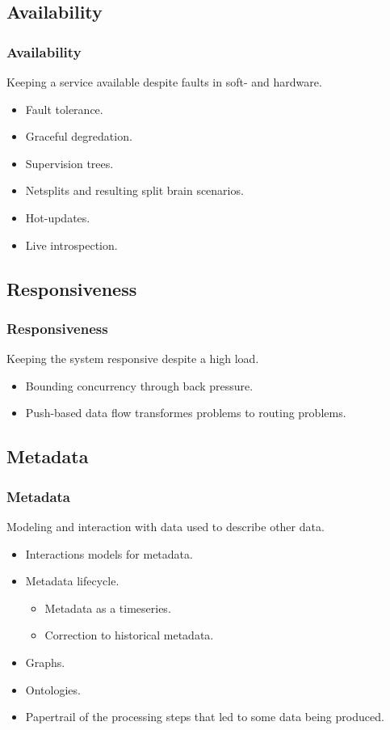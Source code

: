 \subsection{Availability}
\begin{frame}
    \frametitle{Availability}
    \vspace{0mm}
    Keeping a service available despite faults in soft- and hardware. 
    \vspace{3mm}
    \begin{itemize}
        \item Fault tolerance.
        \item Graceful degredation.
        \item Supervision trees.
        \item Netsplits and resulting split brain scenarios.
        \item Hot-updates.
        \item Live introspection.
    \end{itemize}
\end{frame}

\subsection{Responsiveness}
\begin{frame}
    \frametitle{Responsiveness}
    \vspace{0mm}
    Keeping the system responsive despite a high load.
    \vspace{3mm}
    \begin{itemize}
        \item Bounding concurrency through back pressure.
        \item Push-based data flow transformes problems to routing problems.
    \end{itemize}
\end{frame}

\subsection{Metadata}
\begin{frame}
    \frametitle{Metadata}
    \vspace{0mm}
    Modeling and interaction with data used to describe other data.
    \vspace{3mm}
    \begin{itemize}
        \item Interactions models for metadata.
        \item Metadata lifecycle.
          \begin{itemize}
            \item Metadata as a timeseries.
            \item Correction to historical metadata.
          \end{itemize}
        \item Graphs.
        \item Ontologies.
        \item Papertrail of the processing steps that led to some data being produced.
    \end{itemize}
\end{frame}

